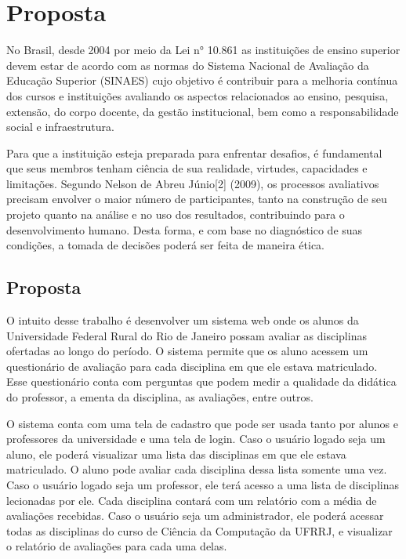 \chapter{Proposta}\label{chp:PROPOSTA}

No Brasil, desde 2004 por meio da Lei n° 10.861 as instituições de ensino superior devem estar de acordo com as normas do Sistema Nacional de Avaliação da Educação Superior (SINAES)
cujo objetivo é contribuir para a melhoria contínua dos cursos e instituições avaliando 
os aspectos relacionados ao ensino, pesquisa, extensão, do corpo docente, da gestão institucional, bem como a responsabilidade social e infraestrutura.

Para que a instituição esteja preparada para enfrentar desafios, é fundamental que seus membros tenham ciência de sua realidade, virtudes, capacidades e limitações.
Segundo Nelson de Abreu Júnio[2] (2009), os processos avaliativos precisam envolver o maior número de participantes, tanto na construção de seu projeto quanto na análise e no uso dos resultados, contribuindo para o desenvolvimento humano. Desta forma, e com base no diagnóstico de suas condições, a tomada de decisões poderá ser feita de maneira ética.


\section{Proposta}
O intuito desse trabalho é desenvolver um sistema web onde os alunos da Universidade Federal Rural do Rio de Janeiro possam avaliar as disciplinas ofertadas ao longo do período. O sistema permite que os aluno acessem um questionário de avaliação para cada disciplina em que ele estava matriculado. Esse questionário conta com perguntas que podem medir a qualidade da didática do professor, a ementa da disciplina, as avaliações, entre outros.

O sistema conta com uma tela de cadastro que pode ser usada tanto por alunos e professores da universidade e uma tela de login. Caso o usuário logado seja um aluno, ele poderá visualizar uma lista das disciplinas em que ele estava matriculado. O aluno pode avaliar cada disciplina dessa lista somente uma vez. Caso o usuário logado seja um professor, ele terá acesso a uma lista de disciplinas lecionadas por ele. Cada disciplina contará com um relatório com a média de avaliações recebidas. Caso o usuário seja um administrador, ele poderá acessar todas as disciplinas do curso de Ciência da Computação da UFRRJ, e visualizar o relatório de avaliações para cada uma delas.

